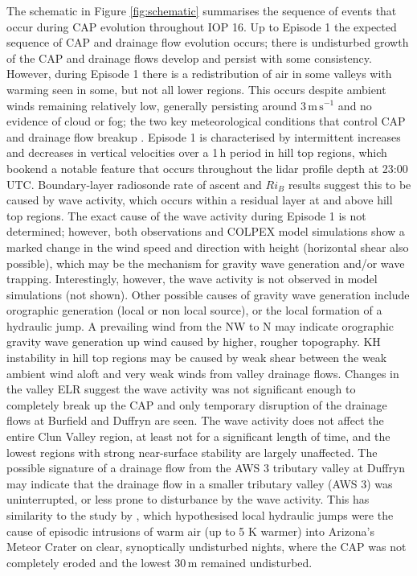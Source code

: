 \documentclass[times]{qjrms4}
\begin{document}
The schematic in Figure \ref{fig:schematic} summarises the sequence of events that occur during CAP evolution throughout IOP 16. Up to Episode 1 the expected sequence of CAP and drainage flow evolution occurs; there is undisturbed growth of the CAP and drainage flows develop and persist with some consistency. However, during Episode 1 there is a redistribution of air in some valleys with warming seen in some, but not all lower regions. This occurs despite ambient winds remaining relatively low, generally persisting around $3\,\mbox{m}\,\mbox{s}^{-1}$ and no evidence of cloud or fog; the two key meteorological conditions that control CAP and drainage flow breakup \citep{sheridan2013characteristics}. Episode 1 is characterised by intermittent increases and decreases in vertical velocities over a 1$\,\mbox{h}$ period in hill top regions, which bookend a notable feature that occurs throughout the lidar profile depth at 23:00 UTC. Boundary-layer radiosonde rate of ascent and $Ri_B$ results suggest this to be caused by wave activity, which occurs within a residual layer at and above hill top regions. The exact cause of the wave activity during Episode 1 is not determined; however, both observations and COLPEX model simulations \citep{Vosper2013narrow} show a marked change in the wind speed and direction with height (horizontal shear also possible), which may be the mechanism for gravity wave generation and/or wave trapping. Interestingly, however, the wave activity is not observed in model simulations (not shown). Other possible causes of gravity wave generation include orographic generation (local or non local source), or the local formation of a hydraulic jump. A prevailing wind from the NW to N may indicate orographic gravity wave generation up wind caused by higher, rougher topography. KH instability in hill top regions may be caused by weak shear between the weak ambient wind aloft and very weak winds from valley drainage flows. Changes in the valley ELR suggest the wave activity was not significant enough to completely break up the CAP and only temporary disruption of the drainage flows at Burfield and Duffryn are seen. The wave activity does not affect the entire Clun Valley region, at least not for a significant length of time, and the lowest regions with strong near-surface stability are largely unaffected. The possible signature of a drainage flow from the AWS 3 tributary valley at Duffryn may indicate that the drainage flow in a smaller tributary valley (AWS 3) was uninterrupted, or less prone to disturbance by the wave activity. This has similarity to the study by \citet{adler2012warm}, which hypothesised local hydraulic jumps were the cause of episodic intrusions of warm air (up to 5 K warmer) into Arizona's Meteor Crater on clear, synoptically undisturbed nights, where the CAP was not completely eroded and the lowest 30$\,\mbox{m}$ remained undisturbed.
\end{document}
